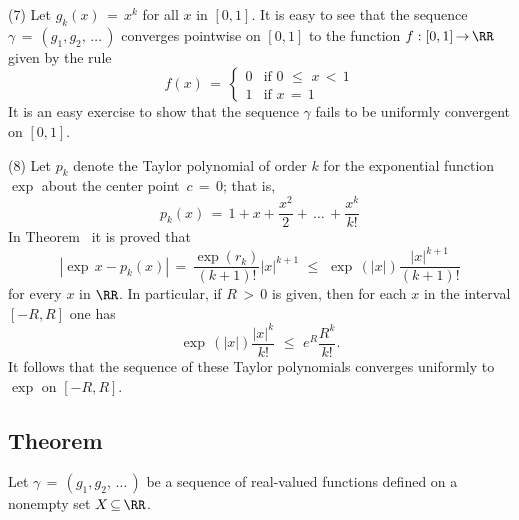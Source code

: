 \V

        (7) Let $g_{k}(x) \,=\, x^{k}$ for all $x$ in $[0,1]$. It is easy to see that the sequence ${\gamma} \,=\, (g_{1},g_{2},\,{\ldots}\,)$ converges pointwise on $[0,1]$ to the function $f:[0,1] \,{\rightarrow}\, {\RR}$ given by the rule
        \begin{displaymath}
        f(x) \,=\, \left\{
        \begin{array}{ll}
        0 & \mbox{if $0\,\,{\leq}\,\,x\,<\,1$} \\
        1 & \mbox{if $x \,=\, 1$}
        \end{array}
                            \right.
        \end{displaymath}
    It is an easy exercise to show that the sequence ${\gamma}$ fails to be uniformly convergent on $[0,1]$.

\V

        (8) Let $p_{k}$ denote the Taylor polynomial of order $k$ for the exponential function ${\exp}$ about the center point~$c \,=\, 0$;
    that is,
        \begin{displaymath}
        p_{k}(x) \,=\, 1+ x+ \frac{x^{2}}{2} + \,{\ldots}\,+\frac{x^{k}}{k!}
        \end{displaymath}
    In Theorem~ it is proved that
        \begin{displaymath}
        |{\exp}\, x - p_{k}(x)| \,=\, \frac{{\exp}(r_{k})}{(k+1)!}|x|^{k+1}\,\,{\leq}\,\,{\exp}\,(|x|)\frac{|x|^{k+1}}{(k+1)!}
        \end{displaymath}
    for every $x$ in ${\RR}$.
    In particular, if $R\,>\,0$ is given, then for each $x$ in the interval $[-R,R]$ one has
        \begin{displaymath}
       {\exp}\,(|x|)\frac{|x|^{k}}{k!}\,\,{\leq}\,\,e^{R}\frac{R^{k}}{k!}.
        \end{displaymath}
    It follows that the sequence of these Taylor polynomials converges uniformly to ${\exp}$ on $[-R,R]$.

\V
\V

            \subsection{\small{\bf Theorem}}
            \label{ThmF05.35}

\V

        Let ${\gamma} \,=\, (g_{1},g_{2},\,{\ldots}\,)$ be a sequence of real-valued functions defined on a nonempty set $X \,{\subseteq}\, {\RR}$.

